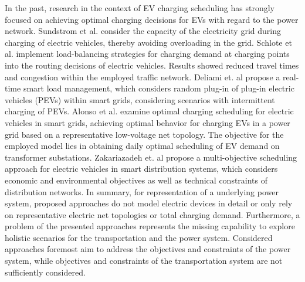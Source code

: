 In the past, research in the context of EV charging scheduling has strongly focused on achieving optimal charging decisions for EVs with regard to the power network. Sundstrom et al. \cite{sundstrom2010planning} consider the capacity of the electricity grid during charging of electric vehicles, thereby avoiding overloading in the grid. Schlote et al. \cite{schlote2012balanced} implement load-balancing strategies for charging demand at charging points into the routing decisions of electric vehicles. Results showed reduced travel times and congestion within the employed traffic network. Deliami et. al \cite{deilami2011real} propose a real-time smart load management, which considers random plug-in of plug-in electric vehicles (PEVs) within smart grids, considering scenarios with intermittent charging of PEVs. Alonso et al. \cite{alonso2014optimal} examine optimal charging scheduling for electric vehicles in smart grids, achieving optimal behavior for charging EVs in a power grid based on a representative low-voltage net topology. The objective for the employed model lies in obtaining daily optimal scheduling of EV demand on transformer substations. Zakariazadeh et. al \cite{zakariazadeh2014multi} propose a multi-objective scheduling approach for electric vehicles in smart distribution systems, which considers economic and environmental objectives as well as technical constraints of distribution networks. In summary, for representation of a underlying power system, proposed approaches do not model electric devices in detail or only rely on representative electric net topologies or total charging demand. Furthermore, a problem of the presented approaches represents the missing capability to explore holistic scenarios for the transportation and the power system. Considered approaches foremost aim to address the objectives and constraints of the power system, while objectives and constraints of the transportation system are not sufficiently considered.

